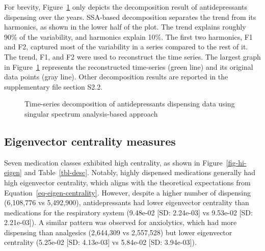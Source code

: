 \documentclass[
  authoryear,
  review]{elsarticle}
\begin{document}
For brevity, Figure~\ref{fig-ssa} only depicts the decomposition result
of antidepressants dispensing over the years. SSA-based decomposition
separates the trend from its harmonics, as shown in the lower half of
the plot. The trend explains roughly 90\% of the variability, and
harmonics explain 10\%. The first two harmonics, F1 and F2, captured
most of the variability in a series compared to the rest of it. The
trend, F1, and F2 were used to reconstruct the time series. The largest
graph in Figure~\ref{fig-ssa} represents the reconstructed time-series
(green line) and its original data points (gray line). Other
decomposition results are reported in the supplementary file section
S2.2.

\begin{figure}[H]


\caption{\label{fig-ssa}Time-series decomposition of antidepressants
dispensing data using singular spectrum analysis-based approach}

\end{figure}%

\subsection{Eigenvector centrality
measures}\label{eigenvector-centrality-measures}

Seven medication classes exhibited high centrality, as shown in
Figure~\ref{fig-hi-eigen} and Table~\ref{tbl-desc}. Notably, highly
dispensed medications generally had high eigenvector centrality, which
aligns with the theoretical expectations from
Equation~\ref{eq-eigen-centrality}. However, despite a higher number of
dispensing (6,108,776 vs 5,492,900), antidepressants had lower
eigenvector centrality than medications for the respiratory system
(9.48e-02 {[}SD: 2.24e-03{]} vs 9.53e-02 {[}SD: 2.21e-03{]}). A similar
pattern was observed for anxiolytics, which had more dispensing than
analgesics (2,644,309 vs 2,557,528) but lower eigenvector centrality
(5.25e-02 {[}SD: 4.13e-03{]} vs 5.84e-02 {[}SD: 3.94e-03{]}).
\end{document}

